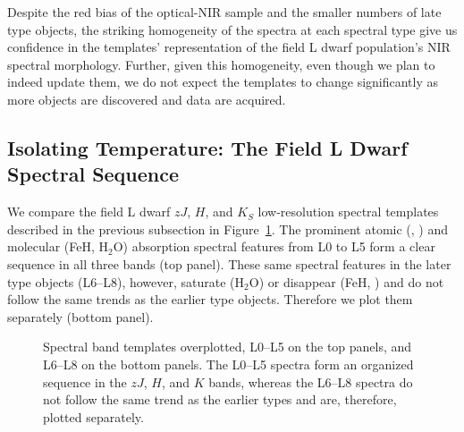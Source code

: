 \documentclass[12pt]{aastex6}
\begin{document}
\clearpage


Despite the red bias of the optical-NIR sample and the smaller numbers of late type objects, the striking homogeneity of the spectra at each spectral type give us confidence in the templates' representation of the field L dwarf population's NIR spectral morphology.
Further, given this homogeneity, even though we plan to indeed update them, we do not expect the templates to change significantly as more objects are discovered and data are acquired.

\subsection{Isolating Temperature: The Field L Dwarf Spectral Sequence}
\label{sec:temp}
We compare the field L dwarf $zJ$, $H$, and $K_S$ low-resolution spectral templates described in the previous subsection in Figure~\ref{fig:spec_sequence}.
The prominent atomic (, ) and molecular (FeH, H$_2$O) absorption spectral features from L0 to L5 form a clear sequence in all three bands (top panel).
These same spectral features in the later type objects (L6--L8), however, saturate (H$_2$O) or disappear (FeH, ) and do not follow the same trends as the earlier type objects. Therefore we plot them separately (bottom panel).



\begin{figure}
    \caption{Spectral band templates overplotted, L0--L5 on the top panels, and L6--L8 on the bottom panels.
    The L0--L5 spectra form an organized sequence in the $zJ$, $H$, and $K$ bands, whereas the L6--L8 spectra do not follow the same trend as the earlier types and are, therefore, plotted separately.}
    \label{fig:spec_sequence}
\end{figure}
\end{document}
